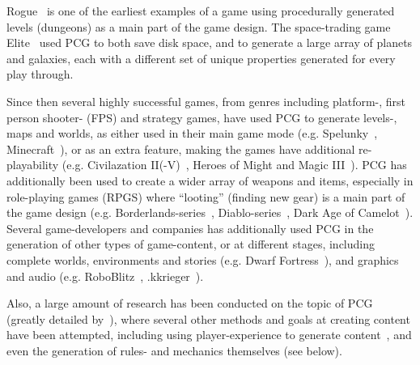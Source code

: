 \documentclass[a4paper,titlepage,final]{report}
\begin{document}
Rogue~\citep{game:rogue} is one of the earliest examples of a game using procedurally generated levels (dungeons) as a main part of the game design.
The space-trading game Elite~\citep{game:elite} used PCG to both save disk space, and to generate a large array of planets and galaxies, each with a different set of unique properties generated for every play through. 

Since then several highly successful games, from genres including platform-, first person shooter- (FPS) and strategy games, have used PCG to generate levels-, maps and worlds, as either used in their main game mode (e.g. Spelunky~\citep{game:spelunky}, Minecraft~\citep{game:minecraft}), or as an extra feature, making the games have additional re-playability (e.g. Civilazation II(-V)~\citep{game:civilizationii}, Heroes of Might and Magic III~\citep{game:homm3}).
PCG has additionally been used to create a wider array of weapons and items, especially in role-playing games (RPGS) where ``looting'' (finding new gear) is a main part of the game design (e.g. Borderlands-series~\citep{game:borderlandsseries}, Diablo-series~\citep{game:diabloseries}, Dark Age of Camelot~\citep{game:darkage}).
Several game-developers and companies has additionally used PCG in the generation of other types of game-content, or at different stages, including complete worlds, environments and stories (e.g. Dwarf Fortress~\citep{game:dwarffortress}), and graphics and audio (e.g. RoboBlitz~\citep{game:roboblitz}, .kkrieger~\citep{game:kkrieger}).

Also, a large amount of research has been conducted on the topic of PCG (greatly detailed by~\citet{shaker2015procedural}), where several other methods and goals at creating content have been attempted, including using player-experience to generate content~\citep{5740836}, 
and even the generation of rules- and mechanics themselves (see below).



\end{document}
